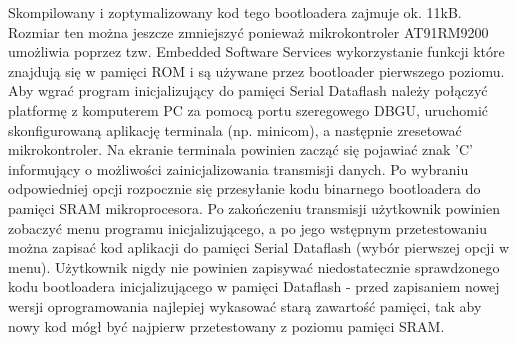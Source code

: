 \documentclass[a4paper,12pt]{book}
\begin{document}
				Skompilowany i zoptymalizowany kod tego bootloadera zajmuje ok. 11kB. Rozmiar ten można jeszcze zmniejszyć ponieważ mikrokontroler AT91RM9200 umożliwia poprzez tzw. Embedded Software Services wykorzystanie funkcji które znajdują się w pamięci ROM i są używane przez bootloader pierwszego poziomu.\\
				Aby wgrać program inicjalizujący do pamięci Serial Dataflash należy połączyć platformę z komputerem PC za pomocą portu szeregowego DBGU, uruchomić skonfigurowaną aplikację terminala (np. minicom), a następnie zresetować mikrokontroler. Na ekranie terminala powinien zacząć się pojawiać znak 'C' informujący o możliwości zainicjalizowania transmisji danych. Po wybraniu odpowiedniej opcji rozpocznie się przesyłanie kodu binarnego bootloadera do pamięci SRAM mikroprocesora. Po zakończeniu transmisji użytkownik powinien zobaczyć menu programu inicjalizującego, a po jego wstępnym przetestowaniu można zapisać kod aplikacji do pamięci Serial Dataflash (wybór pierwszej opcji w menu). Użytkownik nigdy nie powinien zapisywać niedostatecznie sprawdzonego kodu bootloadera inicjalizującego w pamięci Dataflash - przed zapisaniem nowej wersji oprogramowania najlepiej wykasować starą zawartość pamięci, tak aby nowy kod mógł być najpierw przetestowany z poziomu pamięci SRAM.
				
\end{document}
